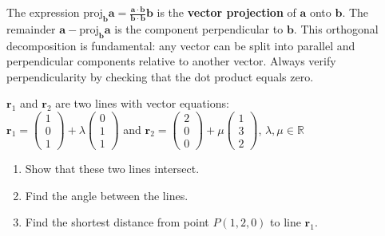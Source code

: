 \begin{takeaways}
The expression $\text{proj}_{\mathbf{b}}\mathbf{a} = \tfrac{\mathbf{a} \cdot \mathbf{b}}{\mathbf{b} \cdot \mathbf{b}}\mathbf{b}$ is the \textbf{vector projection} of $\mathbf{a}$ onto $\mathbf{b}$. The remainder $\mathbf{a} - \text{proj}_{\mathbf{b}}\mathbf{a}$ is the component perpendicular to $\mathbf{b}$. This orthogonal decomposition is fundamental: any vector can be split into parallel and perpendicular components relative to another vector. Always verify perpendicularity by checking that the dot product equals zero.
\end{takeaways}

\vspace{1em}

\begin{problem}
$\mathbf{r}_1$ and $\mathbf{r}_2$ are two lines with vector equations: \\ 
$\mathbf{r}_1 = \begin{pmatrix} 1 \\ 0 \\ 1 \end{pmatrix} + \lambda \begin{pmatrix} 0 \\ 1 \\ 1 \end{pmatrix}$ and 
$\mathbf{r}_2 = \begin{pmatrix} 2 \\ 0 \\ 0 \end{pmatrix} + \mu \begin{pmatrix} 1 \\ 3 \\ 2 \end{pmatrix}$, $\lambda, \mu \in \mathbb{R}$
\begin{enumerate}[label=(\roman*)]
    \item Show that these two lines intersect.
    \item Find the angle between the lines.
    \item Find the shortest distance from point $P(1,2,0)$ to line $\mathbf{r}_1$.
\end{enumerate}
\end{problem}

